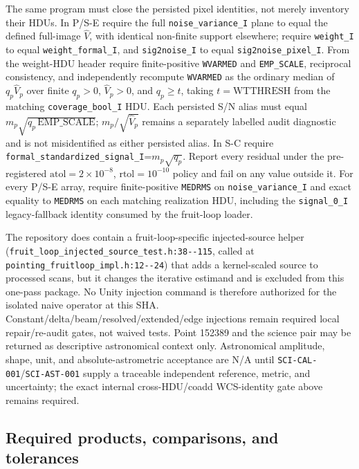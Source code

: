 \documentclass[11pt]{article}
\newcommand{\code}[1]{\nolinkurl{#1}}
\begin{document}
The same program must close the persisted pixel identities, not merely
inventory their HDUs.  In P/S-E require the full \code{noise_variance_I} plane
to equal the defined full-image \(\widehat V\), with identical non-finite
support elsewhere; require \code{weight_I} to equal \code{weight_formal_I}, and
\code{sig2noise_I} to equal \code{sig2noise_pixel_I}.  From the weight-HDU
header require finite-positive \code{WVARMED} and \code{EMP_SCALE}, reciprocal
consistency, and independently recompute \code{WVARMED} as the ordinary median
of \(q_p\widehat V_p\) over finite \(q_p>0\), \(\widehat V_p>0\), and
\(q_p\ge t\), taking \(t=\mathrm{WTTHRESH}\) from the matching
\code{coverage_bool_I} HDU.  Each
persisted S/N alias must equal
\(m_p\sqrt{q_p\,\mathrm{EMP\_SCALE}}\); \(m_p/\sqrt{\widehat V_p}\) remains a
separately labelled audit diagnostic and is not misidentified as either
persisted alias.  In S-C require
\code{formal_standardized_signal_I}=\(m_p\sqrt{q_p}\).  Report every residual
under the pre-registered \(\mathrm{atol}=2\times10^{-8}\),
\(\mathrm{rtol}=10^{-10}\) policy and fail on any value outside it.
For every P/S-E array, require finite-positive \code{MEDRMS} on
\code{noise_variance_I} and exact equality to \code{MEDRMS} on each matching
realization HDU, including the \code{signal_0_I} legacy-fallback identity
consumed by the fruit-loop loader.

The repository does contain a fruit-loop-specific injected-source helper
(\code{fruit_loop_injected_source_test.h:38--115}, called at
\code{pointing_fruitloop_impl.h:12--24}) that adds a kernel-scaled source to
processed scans, but it changes the iterative estimand and is excluded from
this one-pass package.  No Unity injection command
is therefore authorized for the isolated naive operator at this SHA.
Constant/delta/beam/resolved/extended/edge injections remain required local
repair/re-audit gates, not waived tests.  Point 152389 and the science pair may
be returned as descriptive astronomical context only.  Astronomical amplitude,
shape, unit, and absolute-astrometric acceptance are N/A until
\code{SCI-CAL-001}/\code{SCI-AST-001} supply a traceable independent reference,
metric, and uncertainty; the exact internal cross-HDU/coadd WCS-identity gate
above remains required.

\subsection*{Required products, comparisons, and tolerances}
\end{document}
